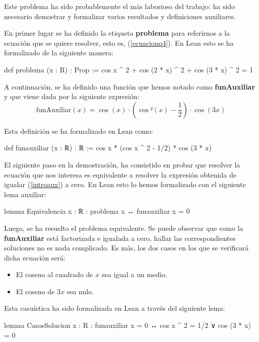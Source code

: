 Este problema ha sido probablemente el más laborioso del trabajo: ha sido
necesario demostrar y formalizar varios resultados y definiciones auxiliares.

En primer lugar se ha definido la etiqueta \textbf{problema} para referirnos
a la ecuación que se quiere resolver, esto es, (\ref{ecuacionq4}). En Lean
esto se ha formalizado de la siguiente manera:
\begin{leancode}
def problema (x : R) : Prop :=
cos x ^ 2 + cos (2 * x) ^ 2 + cos (3 * x) ^ 2 = 1
\end{leancode}

A continuación, se ha definido una función que hemos notado como
\textbf{funAuxiliar} y que viene dada por la siguiente expresión:
\begin{equation}\label{introaux}
  \text{funAuxiliar}(x)=\cos(x)·\left(\cos²(x)-\frac{1}{2}\right)·\cos(3x)
\end{equation}

Esta definición se ha formalizado en Lean como:
\begin{leancode}
def funauxiliar (x : ℝ) : ℝ :=
cos x * (cos x ^ 2 - 1/2) * cos (3 * x)
\end{leancode}

El siguiente paso en la demostración, ha consistido en probar que resolver la
ecuación que nos interesa es equivalente a resolver la expresión obtenida de
igualar (\ref{introaux}) a cero. En Lean esto lo hemos formalizado con el
siguiente lema auxiliar:
\begin{leancode}
lemma Equivalencia
  {x : ℝ}
  : problema x ↔ funauxiliar x = 0 
\end{leancode}

Luego, se ha resuelto el problema equivalente. Se puede observar que
como la \textbf{funAuxiliar} está factorizada e igualada a cero, hallar las
correspondientes soluciones no es nada complicado. Es más, los dos casos
en los que se verificará dicha ecuación será:
\begin{itemize}
\item El coseno al cuadrado de \(x\) sea igual a un medio.

\item El coseno de \(3x\) sea nulo.
\end{itemize}

Esta casuística ha sido formalizada en Lean a través del siguiente lema:
\begin{leancode}
lemma CasosSolucion
  {x : R}
  : funauxiliar x = 0 ↔ cos x ^ 2 = 1/2 ∨ cos (3 * x) = 0
\end{leancode}

